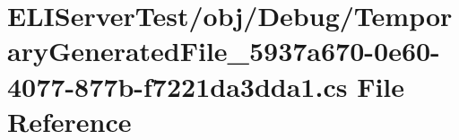 \hypertarget{_e_l_i_server_2_e_l_i_server_test_2obj_2_debug_2_temporary_generated_file__5937a670-0e60-4077-877b-f7221da3dda1_8cs}{}\section{E\+L\+I\+Server\+Test/obj/\+Debug/\+Temporary\+Generated\+File\+\_\+5937a670-\/0e60-\/4077-\/877b-\/f7221da3dda1.cs File Reference}
\label{_e_l_i_server_2_e_l_i_server_test_2obj_2_debug_2_temporary_generated_file__5937a670-0e60-4077-877b-f7221da3dda1_8cs}
